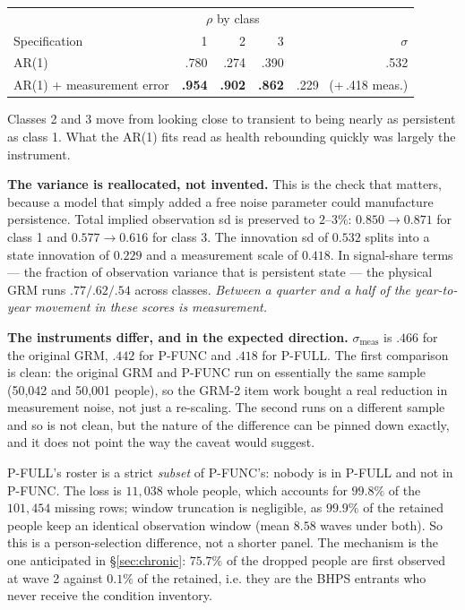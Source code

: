 \documentclass[11pt]{article}
\begin{document}
\begin{center}\small
\begin{tabular}{lrrrr}
\toprule
 & \multicolumn{3}{c}{$\rho$ by class} & \\
Specification & 1 & 2 & 3 & $\sigma$ \\
\midrule
AR(1) & .780 & .274 & .390 & .532 \\
AR(1) + measurement error & \textbf{.954} & \textbf{.902} & \textbf{.862} &
.229 \ (+\,.418 meas.) \\
\bottomrule
\end{tabular}
\end{center}

Classes 2 and 3 move from looking close to transient to being nearly as
persistent as class 1. What the AR(1) fits read as health rebounding quickly
was largely the instrument.

\textbf{The variance is reallocated, not invented.} This is the check that
matters, because a model that simply added a free noise parameter could
manufacture persistence. Total implied observation sd is preserved to
$2$--$3\%$: $0.850 \to 0.871$ for class 1 and $0.577 \to 0.616$ for class 3.
The innovation sd of $0.532$ splits into a state innovation of $0.229$ and a
measurement scale of $0.418$. In signal-share terms --- the fraction of
observation variance that is persistent state --- the physical GRM runs
$.77 / .62 / .54$ across classes. \emph{Between a quarter and a half of the
year-to-year movement in these scores is measurement.}

\textbf{The instruments differ, and in the expected direction.}
$\sigma_{\text{meas}}$ is $.466$ for the original GRM, $.442$ for P-FUNC and
$.418$ for P-FULL. The first comparison is clean: the original GRM and P-FUNC
run on essentially the same sample (50,042 and 50,001 people), so the GRM-2
item work bought a real reduction in measurement noise, not just a
re-scaling. The second runs on a different sample and so is not clean, but
the nature of the difference can be pinned down exactly, and it does not
point the way the caveat would suggest.

P-FULL's roster is a strict \emph{subset} of P-FUNC's: nobody is in P-FULL
and not in P-FUNC. The loss is $11{,}038$ whole people, which accounts for
$99.8\%$ of the $101{,}454$ missing rows; window truncation is negligible, as
$99.9\%$ of the retained people keep an identical observation window (mean
$8.58$ waves under both). So this is a person-selection difference, not a
shorter panel. The mechanism is the one anticipated in \S\ref{sec:chronic}:
$75.7\%$ of the dropped people are first observed at wave 2 against $0.1\%$
of the retained, i.e. they are the BHPS entrants who never receive the
condition inventory.
\end{document}
